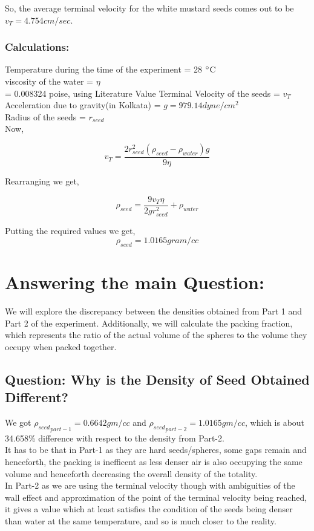 \documentclass[twocolumn,11pt]{article}
\begin{document}
So, the average terminal velocity for the white mustard seeds comes out to be $v_T =4.754 cm/sec.$

\subsubsection{Calculations:}
Temperature during the time of the experiment = 28 $\degree$C\\
viscosity of the water = $\eta$\\ = 	0.008324 poise, using Literature Value \cite{Vis_Lit}
Terminal Velocity of the seeds = $v_T$\\
Acceleration due to gravity(in Kolkata) =  $g= 979.14 dyne/cm^2$\\
Radius of the seeds = $r_{seed}$\\

Now,

\begin{equation}
    \label{Viscousity}
    v_T = \frac{2r_{seed}^2(\rho_{seed} - \rho_{water})g}{9\eta}
\end{equation}

Rearranging we get,

\begin{equation}
\label{density_from_viscousity}
    \rho_{seed} = \frac{9v_{T}\eta}{2g r_{seed}^2} + \rho_{water}
\end{equation}

Putting the required values we get,
 $$\rho_{seed} = 1.0165 gram/cc$$
 
\section{Answering the main Question:}
We will explore the discrepancy between the densities obtained from Part 1 and Part 2 of the experiment. Additionally, we will calculate the packing fraction, which represents the ratio of the actual volume of the spheres to the volume they occupy when packed together.


\subsection{Question: Why is the Density of Seed Obtained Different?}

We got ${\rho_{seed}}_{part-1} = 0.6642 gm/cc$ and ${\rho_{seed}}_{part-2} = 1.0165 gm/cc$, which is about 34.658\% difference with respect to the density from Part-2.
\\
It has to be that in Part-1 as they are hard seeds/spheres, some gaps remain and henceforth, the packing is inefficent as less denser air is also occupying the same volume and henceforth decreasing the overall density of the totality.
\\
In Part-2 as we are using the terminal velocity though with ambiguities of the wall effect and approximation of the point of the terminal velocity being reached, it gives a value which at least satisfies the condition of the seeds being denser than water at the same temperature, and so is much closer to the reality.
\end{document}
